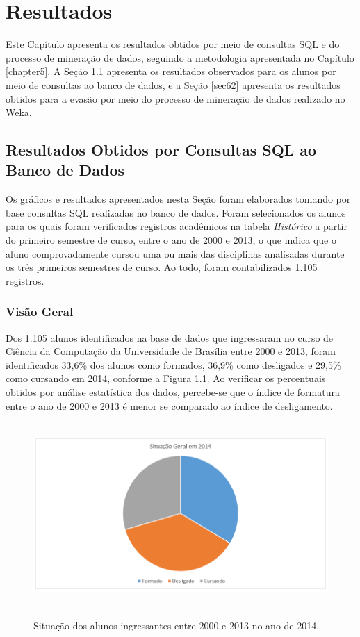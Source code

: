
\chapter{Resultados} \label{chapter6}

Este Capítulo apresenta os resultados obtidos por meio de consultas SQL e do processo de mineração de dados, seguindo a metodologia apresentada no Capítulo \ref{chapter5}. A Seção \ref{sec61} apresenta os resultados observados para os alunos por meio de consultas ao banco de dados, e a Seção \ref{sec62} apresenta os resultados obtidos para a evasão por meio do processo de mineração de dados realizado no Weka.

\section{Resultados Obtidos por Consultas SQL ao Banco de Dados} \label{sec61}

Os gráficos e resultados apresentados nesta Seção foram elaborados tomando por base consultas SQL realizadas no banco de dados. Foram selecionados os alunos para os quais foram verificados registros acadêmicos na tabela \textit{Histórico} a partir do primeiro semestre de curso, entre o ano de 2000 e 2013, o que indica que o aluno comprovadamente cursou uma ou mais das disciplinas analisadas durante os três primeiros semestres de curso. Ao todo, foram contabilizados 1.105 registros.

\subsection{Visão Geral} \label{visao_geral}
Dos 1.105 alunos identificados na base de dados que ingressaram no curso de Ciência da Computação da Universidade de Brasília entre 2000 e 2013, foram identificados 33,6\% dos alunos como formados, 36,9\% como desligados e 29,5\%  como cursando em 2014, conforme a Figura \ref{grafico9}. Ao verificar os percentuais obtidos por análise estatística dos dados, percebe-se que o índice de formatura entre o ano de 2000 e 2013 é menor se comparado ao índice de desligamento.

\begin{figure}[!h]
	\centering
	{\includegraphics[width=14cm, height=7cm]{images/grafico9}}
	\caption {Situação dos alunos ingressantes entre 2000 e 2013 no ano de 2014.}
	\label{grafico9}
\end{figure}
  

